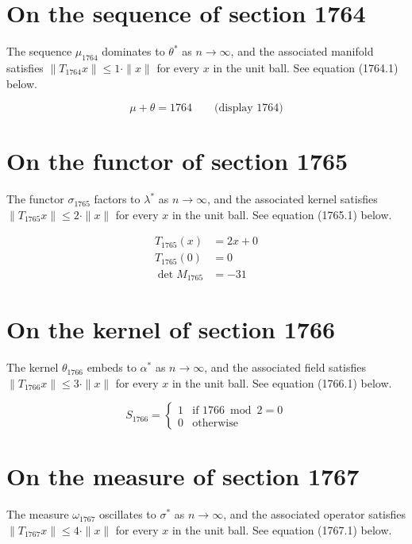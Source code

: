 \documentclass{article}
\begin{document}
\section{On the sequence of section 1764}
The sequence $\mu_{1764}$ dominates to $\theta^{*}$ as $n \to \infty$,
and the associated manifold satisfies $\|T_{1764} x\| \leq 1 \cdot \|x\|$
for every $x$ in the unit ball. See equation (1764.1) below.

$$
\mu + \theta = 1764 \qquad \text{(display 1764)}
$$

\section{On the functor of section 1765}
The functor $\sigma_{1765}$ factors to $\lambda^{*}$ as $n \to \infty$,
and the associated kernel satisfies $\|T_{1765} x\| \leq 2 \cdot \|x\|$
for every $x$ in the unit ball. See equation (1765.1) below.

\begin{align}
T_{1765}(x) &= 2 x + 0 \\
T_{1765}(0) &= 0 \\
\det M_{1765} &= -31
\end{align}

\section{On the kernel of section 1766}
The kernel $\theta_{1766}$ embeds to $\alpha^{*}$ as $n \to \infty$,
and the associated field satisfies $\|T_{1766} x\| \leq 3 \cdot \|x\|$
for every $x$ in the unit ball. See equation (1766.1) below.

\begin{equation}
S_{1766} = \begin{cases} 1 & \text{if } 1766 \bmod 2 = 0 \\ 0 & \text{otherwise} \end{cases}
\end{equation}

\section{On the measure of section 1767}
The measure $\omega_{1767}$ oscillates to $\sigma^{*}$ as $n \to \infty$,
and the associated operator satisfies $\|T_{1767} x\| \leq 4 \cdot \|x\|$
for every $x$ in the unit ball. See equation (1767.1) below.
\end{document}
